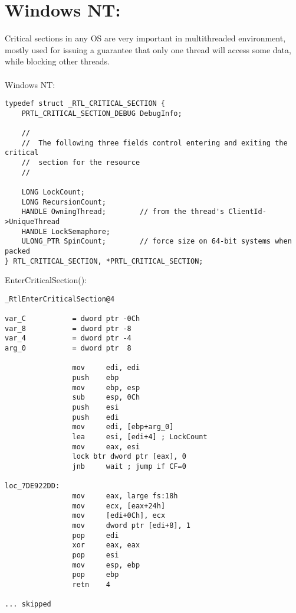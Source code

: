 ﻿\section{Windows NT: }

\label{critical_sections}

{Critical sections in any \ac{OS} are very important in multithreaded environment,
mostly used for issuing a guarantee
that only one thread will access some data, while blocking other threads}. \\
\\
  
 \gls{Windows NT}:

\begin{lstlisting}[caption=(Windows Research Kernel v1.2) public/sdk/inc/nturtl.h]
typedef struct _RTL_CRITICAL_SECTION {
    PRTL_CRITICAL_SECTION_DEBUG DebugInfo;

    //
    //  The following three fields control entering and exiting the critical
    //  section for the resource
    //

    LONG LockCount;
    LONG RecursionCount;
    HANDLE OwningThread;        // from the thread's ClientId->UniqueThread
    HANDLE LockSemaphore;
    ULONG_PTR SpinCount;        // force size on 64-bit systems when packed
} RTL_CRITICAL_SECTION, *PRTL_CRITICAL_SECTION;
\end{lstlisting}

 EnterCriticalSection():

\begin{lstlisting}[caption=Windows 2008/ntdll.dll/x86 (begin)]
_RtlEnterCriticalSection@4

var_C           = dword ptr -0Ch
var_8           = dword ptr -8
var_4           = dword ptr -4
arg_0           = dword ptr  8

                mov     edi, edi
                push    ebp
                mov     ebp, esp
                sub     esp, 0Ch
                push    esi
                push    edi
                mov     edi, [ebp+arg_0]
                lea     esi, [edi+4] ; LockCount
                mov     eax, esi
                lock btr dword ptr [eax], 0
                jnb     wait ; jump if CF=0

loc_7DE922DD:
                mov     eax, large fs:18h
                mov     ecx, [eax+24h]
                mov     [edi+0Ch], ecx
                mov     dword ptr [edi+8], 1
                pop     edi
                xor     eax, eax
                pop     esi
                mov     esp, ebp
                pop     ebp
                retn    4

... skipped
\end{lstlisting}

